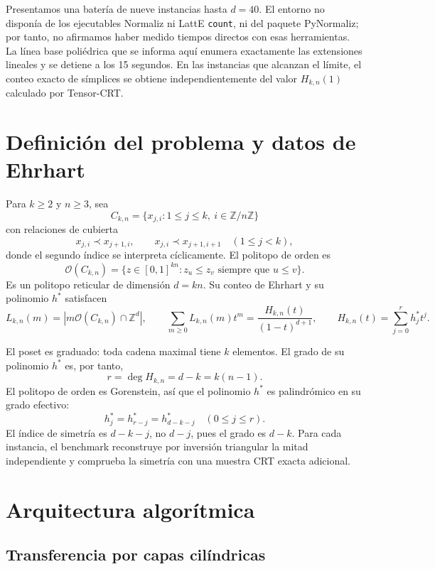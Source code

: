 \documentclass[11pt,a4paper]{article}
\newcommand{\Ocal}{\mathcal{O}}
\newcommand{\Z}{\mathbb{Z}}
\begin{document}
Presentamos una batería de nueve instancias hasta $d=40$. El entorno no
disponía de los ejecutables Normaliz ni LattE \texttt{count}, ni del paquete
PyNormaliz; por tanto, no afirmamos haber medido tiempos directos con esas
herramientas. La línea base poliédrica que se informa aquí enumera
exactamente las extensiones lineales y se detiene a los 15 segundos. En las
instancias que alcanzan el límite, el conteo exacto de símplices se obtiene
independientemente del valor $H_{k,n}(1)$ calculado por Tensor-CRT.

\section{Definición del problema y datos de Ehrhart}

Para $k\geq2$ y $n\geq3$, sea
\[
  C_{k,n}=\{x_{j,i}:1\leq j\leq k,\ i\in\Z/n\Z\}
\]
con relaciones de cubierta
\[
  x_{j,i}\prec x_{j+1,i},
  \qquad
  x_{j,i}\prec x_{j+1,i+1}
  \quad (1\leq j<k),
\]
donde el segundo índice se interpreta cíclicamente. El politopo de orden
es
\[
  \Ocal(C_{k,n})=
  \{z\in[0,1]^{kn}:z_u\leq z_v\text{ siempre que }u\leq v\}.
\]
Es un politopo reticular de dimensión $d=kn$. Su conteo de Ehrhart y su
polinomio $h^*$ satisfacen
\begin{equation}
  L_{k,n}(m)=|m\Ocal(C_{k,n})\cap\Z^d|,
  \qquad
  \sum_{m\geq0}L_{k,n}(m)t^m
  =\frac{H_{k,n}(t)}{(1-t)^{d+1}},
  \qquad
  H_{k,n}(t)=\sum_{j=0}^{r}h_j^*t^j.
  \label{eq:ehrhart}
\end{equation}

El poset es graduado: toda cadena maximal tiene $k$ elementos. El grado
de su polinomio $h^*$ es, por tanto,
\[
  r=\deg H_{k,n}=d-k=k(n-1).
\]
El politopo de orden es Gorenstein, así que el polinomio $h^*$ es
palindrómico en su grado efectivo:
\begin{equation}
  h_j^*=h_{r-j}^*=h_{d-k-j}^*
  \quad (0\leq j\leq r).
  \label{eq:palindromic}
\end{equation}
El índice de simetría es $d-k-j$, no $d-j$, pues el grado es $d-k$.
Para cada instancia, el benchmark reconstruye por inversión triangular
la mitad independiente y comprueba la simetría con una muestra CRT exacta
adicional.

\section{Arquitectura algorítmica}

\subsection{Transferencia por capas cilíndricas}
\end{document}
